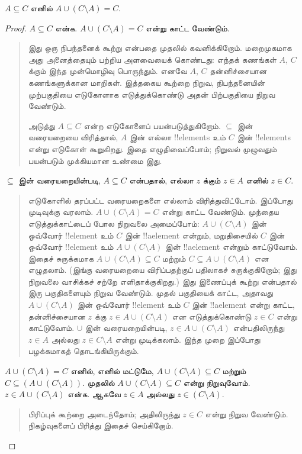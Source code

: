 \documentclass[../../../include/open-logic-section]{subfiles}
\begin{document}


\begin{prop}
$A \subseteq C$ எனில் $A \cup (C \setminus A) = C$.
\end{prop}

\begin{proof}
  $A \subseteq C$ என்க. $A \cup (C \setminus A) = C$
  என்று காட்ட வேண்டும்.
  \begin{quote}
    இது ஒரு நிபந்தனைக் கூற்று என்பதை முதலில் கவனிக்கிறோம்.
    மறைமுகமாக அது அனைத்தையும் பற்றிய அளவையைக் கொண்டது:
    எந்தக் கணங்கள் $A$, $C$ க்கும் இந்த முன்மொழிவு பொருந்தும்.
    எனவே $A$, $C$ தன்னிச்சையான கணங்களுக்கான மாறிகள்.
    இத்தகைய கூற்றை நிறுவ, நிபந்தனையின் முற்பகுதியை
    எடுகோளாக எடுத்துக்கொண்டு அதன் பிற்பகுதியை நிறுவ வேண்டும்.

    அடுத்து $A \subseteq C$ என்ற எடுகோளைப் பயன்படுத்துகிறோம்.
    $\subseteq$ இன் வரையறையை விரித்தால், $A$ இன்
    எல்லா !!{element}s உம் $C$ இன் !!{element}s என்று
    எடுகோள் கூறுகிறது. இதை எழுதிவைப்போம்; நிறுவல் முழுவதும்
    பயன்படும் முக்கியமான உண்மை இது.
  \end{quote}
  $\subseteq$ இன் வரையறையின்படி, $A \subseteq C$
  என்பதால், எல்லா $z$ க்கும் $z \in A$ எனில்
  $z \in C$.
  \begin{quote}
    எடுகோளில் தரப்பட்ட வரையறைகளை எல்லாம் விரித்துவிட்டோம்.
    இப்போது முடிவுக்கு வரலாம். $A \cup (C \setminus A) = C$
    என்று காட்ட வேண்டும். முந்தைய எடுத்துக்காட்டைப் போல
    நிறுவலை அமைப்போம்: $A \cup (C \setminus A)$ இன்
    ஒவ்வோர் !!{element} உம் $C$ இன் !!a{element}
    என்றும், மறுதிசையில் $C$ இன் ஒவ்வோர் !!{element}
    உம் $A \cup (C \setminus A)$ இன் !!a{element}
    என்றும் காட்டுவோம். இதைச் சுருக்கமாக
    $A \cup (C \setminus A) \subseteq C$ மற்றும்
    $C \subseteq A \cup (C \setminus A)$ என எழுதலாம்.
    (இங்கு வரையறையை விரிப்பதற்குப் பதிலாகச் சுருக்குகிறோம்;
    இது நிறுவலை வாசிக்கச் சற்றே எளிதாக்குகிறது.)
    இது இணைப்புக் கூற்று என்பதால் இரு பகுதிகளையும்
    நிறுவ வேண்டும். முதல் பகுதியைக் காட்ட, அதாவது
    $A \cup (C \setminus A)$ இன் ஒவ்வோர் !!{element}
    உம் $C$ இன் !!a{element} என்று காட்ட, தன்னிச்சையான
    $z$ க்கு $z \in A \cup (C \setminus A)$ என
    எடுத்துக்கொண்டு $z \in C$ என்று காட்டுவோம்.
    $\cup$ இன் வரையறையின்படி, $z \in A \cup (C \setminus A)$
    என்பதிலிருந்து $z \in A$ அல்லது $z \in C \setminus A$
    என்று முடிக்கலாம். இந்த முறை இப்போது பழக்கமாகத்
    தொடங்கியிருக்கும்.
  \end{quote}
  $A \cup (C \setminus A) = C$ எனில், எனில் மட்டுமே,
  $A \cup (C \setminus A) \subseteq C$ மற்றும்
  $C \subseteq (A \cup (C \setminus A))$. முதலில்
  $A \cup (C \setminus A) \subseteq C$ என்று நிறுவுவோம்.
  $z \in A \cup (C \setminus A)$ என்க. ஆகவே
  $z \in A$ அல்லது $z \in (C \setminus A)$.
  \begin{quote}
    பிரிப்புக் கூற்றை அடைந்தோம்; அதிலிருந்து
    $z \in C$ என்று நிறுவ வேண்டும். நிகழ்வுகளைப்
    பிரித்து இதைச் செய்கிறோம்.
  \end{quote}


\end{proof}
\end{document}
